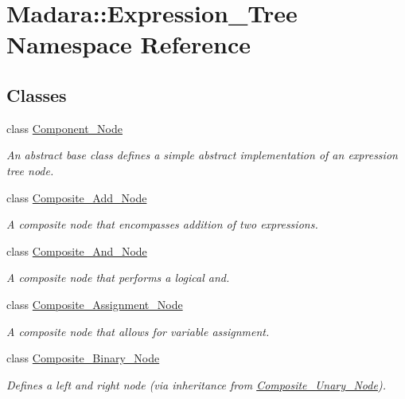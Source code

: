 \hypertarget{namespaceMadara_1_1Expression__Tree}{
\section{Madara::Expression\_\-Tree Namespace Reference}
\label{df/d66/namespaceMadara_1_1Expression__Tree}
}
\subsection*{Classes}
\begin{DoxyCompactItemize}
\item 
class \hyperlink{classMadara_1_1Expression__Tree_1_1Component__Node}{Component\_\-Node}
\begin{DoxyCompactList}\small\item\em An abstract base class defines a simple abstract implementation of an expression tree node. \item\end{DoxyCompactList}\item 
class \hyperlink{classMadara_1_1Expression__Tree_1_1Composite__Add__Node}{Composite\_\-Add\_\-Node}
\begin{DoxyCompactList}\small\item\em A composite node that encompasses addition of two expressions. \item\end{DoxyCompactList}\item 
class \hyperlink{classMadara_1_1Expression__Tree_1_1Composite__And__Node}{Composite\_\-And\_\-Node}
\begin{DoxyCompactList}\small\item\em A composite node that performs a logical and. \item\end{DoxyCompactList}\item 
class \hyperlink{classMadara_1_1Expression__Tree_1_1Composite__Assignment__Node}{Composite\_\-Assignment\_\-Node}
\begin{DoxyCompactList}\small\item\em A composite node that allows for variable assignment. \item\end{DoxyCompactList}\item 
class \hyperlink{classMadara_1_1Expression__Tree_1_1Composite__Binary__Node}{Composite\_\-Binary\_\-Node}
\begin{DoxyCompactList}\small\item\em Defines a left and right node (via inheritance from \hyperlink{classMadara_1_1Expression__Tree_1_1Composite__Unary__Node}{Composite\_\-Unary\_\-Node}). \item\end{DoxyCompactList}\item 

\end{DoxyCompactItemize}
